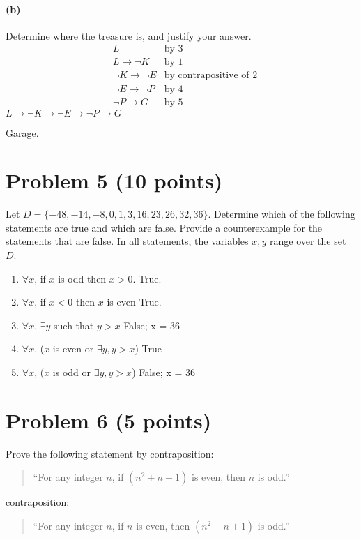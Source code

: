 \documentclass[english]{article}
\begin{document}
\paragraph{(b)} Determine where the treasure is, and justify your answer.
\begin{align}
  & L & \text{by 3}\\
  & L \to \lnot K & \text{by 1}\\
  & \lnot K \to \lnot E & \text{by contrapositive of 2}\\
  & \lnot E \to \lnot P & \text{by 4}\\
  & \lnot P \to G & \text{by 5}
\end{align}
$L \to \lnot K \to \lnot E \to \lnot P \to G$

Garage.

\section*{Problem 5 (10 points)}

Let $D = \{-48,-14,-8,0,1,3,16,23,26,32,36\}$.
Determine which of the following statements are true and which are false.
Provide a counterexample for the statements that are false.
In all statements, the variables $x,y$ range over the set $D$.

\begin{enumerate}
\item $\forall x$, if $x$ is odd then $x>0$.
  True.
\item $\forall x$, if $x<0$ then $x$ is even
  True.
\item $\forall x$, $\exists y$ such that $y > x$
  False; x = 36
\item $\forall x$, ($x$ is even or $\exists y, y>x$)
  True
\item $\forall x$, ($x$ is odd  or $\exists y, y>x$)
  False; x = 36
\end{enumerate}

\section*{Problem 6 (5 points)}

Prove the following statement by contraposition:

\begin{quote}
  ``For any integer $n$, if $(n^2+n+1)$ is even, then $n$ is odd.''
\end{quote}

contraposition:
\begin{quote}
  ``For any integer $n$, if $n$ is even, then $(n^2+n+1)$ is odd.''
\end{quote}
\end{document}
